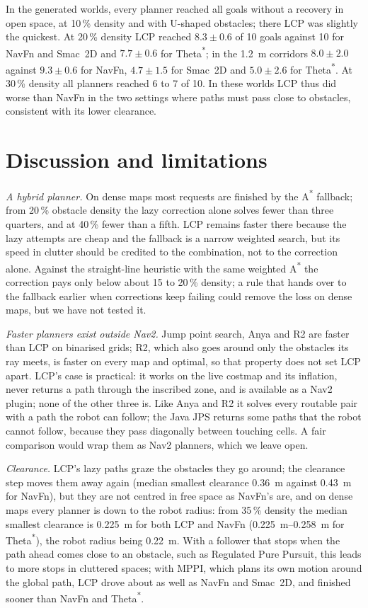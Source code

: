 \documentclass[conference]{IEEEtran}
\newcommand{\lcp}{LCP}
\begin{document}
In the generated worlds, every planner reached all goals without a recovery in
open space, at 10\,\% density and with U-shaped obstacles; there \lcp{} was
slightly the quickest. At 20\,\% density \lcp{} reached $8.3 \pm 0.6$ of 10 goals
against 10 for NavFn and Smac~2D and $7.7 \pm 0.6$ for
Theta\textsuperscript{*}; in the \SI{1.2}{m} corridors $8.0 \pm 2.0$ against
$9.3 \pm 0.6$ for NavFn, $4.7 \pm 1.5$ for Smac~2D and $5.0 \pm 2.6$ for
Theta\textsuperscript{*}. At 30\,\% density all planners reached 6 to 7 of 10. In
these worlds \lcp{} thus did worse than NavFn in the two settings where paths
must pass close to obstacles, consistent with its lower clearance.

\section{Discussion and limitations}

\emph{A hybrid planner.} On dense maps most requests are finished by the
A\textsuperscript{*} fallback; from 20\,\% obstacle density the lazy correction
alone solves fewer than three quarters, and at 40\,\% fewer than a fifth. \lcp{}
remains faster there because the lazy attempts are cheap and the fallback is a
narrow weighted search, but its speed in clutter should be credited to the
combination, not to the correction alone. Against the straight-line heuristic
with the same weighted A\textsuperscript{*} the correction pays only below about
15 to 20\,\% density; a rule that hands over to the fallback earlier when
corrections keep failing could remove the loss on dense maps, but we have not
tested it.

\emph{Faster planners exist outside Nav2.} Jump point search, Anya and R2 are faster
than \lcp{} on binarised grids; R2, which also goes around only the obstacles its
ray meets, is faster on every map and optimal, so that property does not set \lcp{}
apart. \lcp{}'s case is practical: it works on the live
costmap and its inflation, never returns a path through the inscribed zone, and
is available as a Nav2 plugin; none of the other three is. Like Anya and R2 it solves
every routable pair with a path the robot can follow; the Java JPS returns some
paths that the robot cannot follow, because they pass diagonally between
touching cells. A fair comparison would wrap them as Nav2
planners, which we leave open.

\emph{Clearance.} \lcp{}'s lazy paths graze the obstacles they go around; the
clearance step moves them away again (median smallest clearance \SI{0.36}{m}
against \SI{0.43}{m} for NavFn), but they are not centred in free space as
NavFn's are, and on dense maps every planner is down to the robot radius: from
35\,\% density the median smallest clearance is \SI{0.225}{m} for both \lcp{} and
NavFn (\SIrange{0.225}{0.258}{m} for Theta\textsuperscript{*}), the robot radius
being \SI{0.22}{m}. With a
follower that stops when the path ahead comes close to an obstacle, such as
Regulated Pure Pursuit, this leads to more stops in cluttered spaces; with MPPI,
which plans its own motion around the global path, \lcp{} drove about as well as
NavFn and Smac~2D, and finished sooner than NavFn and Theta\textsuperscript{*}.
\end{document}
